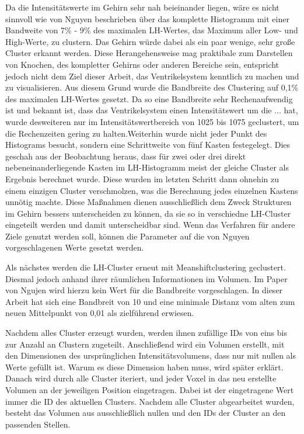 Da die Intensitätswerte im Gehirn sehr nah beieinander liegen, wäre es nicht sinnvoll wie von Nguyen beschrieben über das komplette Histogramm mit einer Bandweite von 7\% - 9\% des maximalen LH-Wertes, das Maximum aller Low- und High-Werte, zu clustern. Das Gehirn würde dabei als ein paar wenige, sehr große Cluster erkannt werden. Diese Herangehensweise mag praktibale zum Darstellen von Knochen, des kompletter Gehirns oder anderen Bereiche sein, entspricht jedoch nicht dem Ziel dieser Arbeit, das Ventrikelsystem kenntlich zu machen und zu visualisieren. Aus diesem Grund wurde die Bandbreite des Clustering auf 0,1\% des maximalen LH-Wertes gesetzt. Da so eine Bandbreite sehr Rechenaufwendig ist und bekannt ist, dass das Ventrikelsystem einen Intensitätswert um die ... hat, wurde desweiteren nur im Intensitätswertbereich von 1025 bis 1075 geclustert, um die Rechenzeiten gering zu halten.Weiterhin wurde nicht jeder Punkt des Histograms besucht, sondern eine Schrittweite von fünf Kasten festegelegt. Dies geschah aus der Beobachtung heraus, dass für zwei oder drei direkt nebeneinanderliegende Kasten im LH-Histogramm meist der gleiche Cluster als Ergebnis berechnet wurde. Diese wurden im letzten Schritt dann ohnehin zu einem einzigen Cluster verschmolzen, was die Berechnung jedes einzelnen Kastens unnötig machte. Diese Maßnahmen dienen ausschließlich dem Zweck Strukturen im Gehirn bessers unterscheiden zu können, da sie so in verschiedne LH-Cluster eingeteilt werden und damit unterscheidbar sind. Wenn das Verfahren für andere Ziele genutzt werden soll, können die Parameter auf die von Nguyen vorgeschlagenen Werte gesetzt werden. 




Als nächstes werden die LH-Cluster erneut mit Meanshiftclustering geclustert. Diesmal jedoch anhand ihrer räumlichen Informationen im Volumen. Im Paper von Ngujen wird hierzu kein Wert für die Bandbreite vorgeschlagen. In dieser Arbeit hat sich eine Bandbreit von 10  und eine minimale Distanz vom alten zum neuen Mittelpunkt von 0,01 als zielführend erwiesen.



Nachdem alles Cluster erzeugt wurden, werden ihnen zufällige IDs von eins bis zur Anzahl an Clustern zugeteilt. Anschließend wird ein Volumen erstellt, mit den Dimensionen des ursprünglichen Intensitätsvolumens, dass nur mit nullen als Werte gefüllt ist. Warum es diese Dimension haben muss, wird später erklärt. Danach wird durch alle Cluster iteriert, und jeder Voxel in das neu erstellte Volumen an der jeweiligen Position eingetragen. Dabei ist der eingetragene Wert immer die  ID des aktuellen Clusters. Nachdem alle Cluster abgearbeitet wurden, besteht das Volumen aus ausschließlich nullen und den IDs der Cluster an den passenden Stellen.


